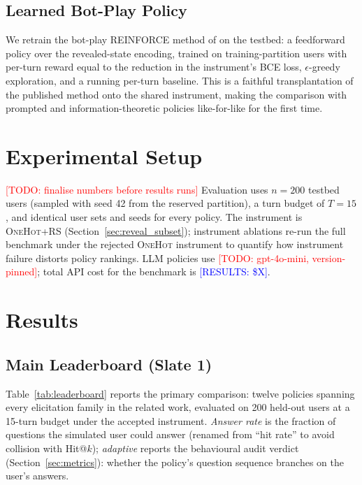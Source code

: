 \documentclass[11pt]{article}
\newcommand{\todo}[1]{\textcolor{red}{[TODO: #1]}}
\newcommand{\results}[1]{\textcolor{blue}{[RESULTS: #1]}}
\begin{document}
\subsection{Learned Bot-Play Policy}

We retrain the bot-play REINFORCE method of \citet{makarova2024learning} on
the testbed: a feedforward policy over the revealed-state encoding, trained
on training-partition users with per-turn reward equal to the reduction in
the instrument's BCE loss, $\epsilon$-greedy exploration, and a running
per-turn baseline. This is a faithful transplantation of the published
method onto the shared instrument, making the comparison with prompted and
information-theoretic policies like-for-like for the first time.

\section{Experimental Setup}
\label{sec:setup}

\todo{finalise numbers before results runs}
Evaluation uses $n = 200$ testbed users (sampled with seed 42 from the
reserved partition), a turn budget of $T = 15$, and identical user sets and
seeds for every policy. The instrument is \textsc{OneHot+RS}
(Section~\ref{sec:reveal_subset}); instrument ablations re-run the full
benchmark under the rejected \textsc{OneHot} instrument to quantify how
instrument failure distorts policy rankings. LLM policies use
\todo{gpt-4o-mini, version-pinned}; total API cost for the benchmark is
\results{\$X}.

\section{Results}
\label{sec:results}

\subsection{Main Leaderboard (Slate 1)}

Table~\ref{tab:leaderboard} reports the primary comparison: twelve
policies spanning every elicitation family in the related work, evaluated
on 200 held-out users at a 15-turn budget under the accepted instrument.
\emph{Answer rate} is the fraction of questions the simulated user could
answer (renamed from ``hit rate'' to avoid collision with Hit@$k$);
\emph{adaptive} reports the behavioural audit verdict (Section~\ref{sec:metrics}):
whether the policy's question sequence branches on the user's answers.
\end{document}
